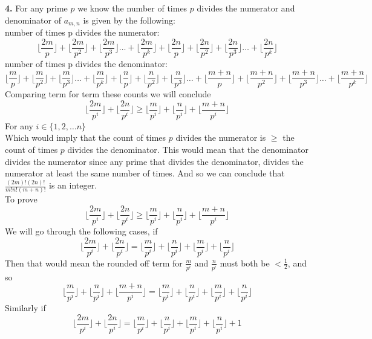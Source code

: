 \documentclass[12pt]{article}
\newenvironment{ques}{\vspace{2 ex}}{\vspace{2 ex}}
\theoremstyle{definition}
\begin{document}
\begin{ques}
	\textbf{4.} For any prime $p$ we know the number of times $p$ divides
		the numerator and denominator of $a_{m,n}$ is given by the following:\\
		number of times p divides the numerator: 
		$$\lfloor \frac{2m}p\rfloor + \lfloor \frac{2m}{p^2}\rfloor +
		\lfloor \frac{2m}{p^3}\rfloor \dots + \lfloor
		\frac{2m}{p^k}\rfloor + \lfloor \frac{2n}p\rfloor + \lfloor
		\frac{2n}{p^2}\rfloor + \lfloor \frac{2n}{p^3}\rfloor \dots +
		\lfloor \frac{2n}{p^k}\rfloor$$
		number of times p divides the denominator: 
		$$\lfloor \frac{m}p\rfloor + \lfloor \frac{m}{p^2}\rfloor +
		\lfloor \frac{m}{p^3}\rfloor \dots + \lfloor
		\frac{m}{p^k}\rfloor + \lfloor \frac{n}p\rfloor + \lfloor
		\frac{n}{p^2}\rfloor + \lfloor \frac{n}{p^3}\rfloor \dots +
		\lfloor \frac{m + n}{p}\rfloor + \lfloor \frac{m +
		n}{p^2}\rfloor + \lfloor \frac{m + n}{p^3}\rfloor \dots + \lfloor
		\frac{m + n}{p^k}\rfloor$$
		Comparing term for term these counts we will conclude
		$$\lfloor\frac{2m}{p^i}\rfloor + \lfloor\frac{2n}{p^i}\rfloor
		\geq \lfloor\frac m {p^i}\rfloor + \lfloor\frac{n}{p^i}\rfloor
		+ \lfloor\frac{m+n}{p^i}\rfloor$$
		For any $i \in \{1,2,\dots n\}$\\
		Which would imply that the count of times $p$ divides the
		numerator is $\geq$ the count of times $p$ divides the
		denominator. This would mean that the denominator divides the
		numerator since any prime that divides the denominator, divides
		the numerator at least the same number of times. And so we can conclude that
		$\frac{(2m)!(2n)!}{m!n!(m+n)!}$ is an integer.\\
		To prove
		$$\lfloor\frac{2m}{p^i}\rfloor + \lfloor\frac{2n}{p^i}\rfloor
		\geq \lfloor\frac m {p^i}\rfloor + \lfloor\frac{n}{p^i}\rfloor
		+ \lfloor\frac{m+n}{p^i}\rfloor$$
		We will go through the following cases, if
		$$\lfloor\frac{2m}{p^i}\rfloor + \lfloor\frac{2n}{p^i}\rfloor
		= \lfloor\frac{m}{p^i}\rfloor + \lfloor\frac{n}{p^i}\rfloor +
		\lfloor\frac{m}{p^i}\rfloor + \lfloor\frac{n}{p^i}\rfloor$$
		Then that would mean the rounded off term for $\frac m {p^i}$
		and $\frac n {p^i}$ must both be $< \frac 1 2$, and so
		$$\lfloor\frac m {p^i}\rfloor + \lfloor\frac{n}{p^i}\rfloor +
		\lfloor\frac{m+n}{p^i}\rfloor = \lfloor\frac{m}{p^i}\rfloor +
		\lfloor\frac{n}{p^i}\rfloor + \lfloor\frac{m}{p^i}\rfloor +
		\lfloor\frac{n}{p^i}\rfloor$$
		Similarly if
		$$\lfloor\frac{2m}{p^i}\rfloor + \lfloor\frac{2n}{p^i}\rfloor
		= \lfloor\frac{m}{p^i}\rfloor + \lfloor\frac{n}{p^i}\rfloor +
		\lfloor\frac{m}{p^i}\rfloor + \lfloor\frac{n}{p^i}\rfloor + 1$$

\end{ques}
\end{document}
